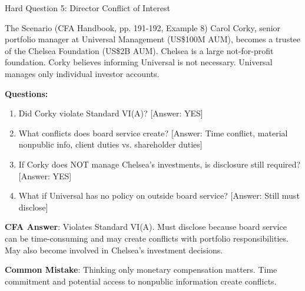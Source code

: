 \documentclass{beamer}
\begin{document}
	\begin{frame}{Hard Question 5: Director Conflict of Interest}
		\begin{block}{The Scenario (CFA Handbook, pp. 191-192, Example 8)}
			Carol Corky, senior portfolio manager at Universal Management (US\$100M AUM), becomes a trustee of the Chelsea Foundation (US\$2B AUM). Chelsea is a large not-for-profit foundation. Corky believes informing Universal is not necessary. Universal manages only individual investor accounts.
		\end{block}
		
		\vspace{0.2cm}
		\textbf{Questions:}
		\begin{enumerate}
			\item Did Corky violate Standard VI(A)? \textcolor{cfared}{[Answer: YES]}
			\item What conflicts does board service create? \textcolor{cfared}{[Answer: Time conflict, material nonpublic info, client duties vs. shareholder duties]}
			\item If Corky does NOT manage Chelsea's investments, is disclosure still required? \textcolor{cfared}{[Answer: YES]}
			\item What if Universal has no policy on outside board service? \textcolor{cfared}{[Answer: Still must disclose]}
		\end{enumerate}
		
		\vspace{0.2cm}
		\textcolor{cfablue}{\textbf{CFA Answer}}: Violates Standard VI(A). Must disclose because board service can be time-consuming and may create conflicts with portfolio responsibilities. May also become involved in Chelsea's investment decisions.
		
		\vspace{0.1cm}
		\textcolor{cfared}{\textbf{Common Mistake}}: Thinking only monetary compensation matters. Time commitment and potential access to nonpublic information create conflicts.
	\end{frame}
	
\end{document}
